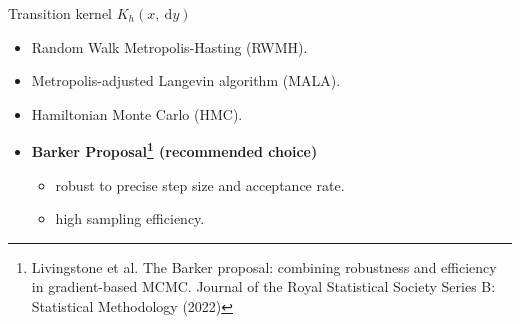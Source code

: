 \documentclass[10pt,xcolor=table]{beamer}
\begin{document}
\begin{frame}{Transition kernel $K_h(x, \mathrm{~d} y)$}
\begin{itemize}
    \item Random Walk Metropolis-Hasting (RWMH). 
    \item Metropolis-adjusted Langevin algorithm (MALA).
    \item Hamiltonian Monte Carlo (HMC).
    \item \textbf{Barker Proposal\footnote{Livingstone et al. The Barker proposal: combining robustness and efficiency in gradient-based MCMC. Journal of the Royal Statistical Society Series B: Statistical Methodology (2022)} (recommended choice)}
    \begin{itemize}
    	\item robust to precise step size and acceptance rate. 
    	\item high sampling efficiency.
    \end{itemize}
\end{itemize}
\end{frame}
\end{document}
